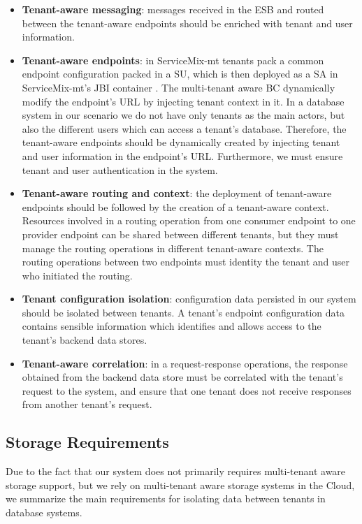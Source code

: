 	\begin{itemize}
		\item \textbf{Tenant-aware messaging}: messages received in the \ac{ESB} and routed between the tenant-aware endpoints should be enriched with tenant and user information. 
		\item \textbf{Tenant-aware endpoints}: in ServiceMix-mt tenants pack a common endpoint configuration packed in a \ac{SU}, which is then deployed as a \ac{SA} in ServiceMix-mt's \ac{JBI} container \cite{gomez2012}. The multi-tenant aware \ac{BC} dynamically modify the endpoint's URL by injecting tenant context in it. In a database system in our scenario we do not have only tenants as the main actors, but also the different users which can access a tenant's database. Therefore, the tenant-aware endpoints should be dynamically created by injecting tenant and user information in the endpoint's URL. Furthermore, we must ensure tenant and user authentication in the system. 
		\item \textbf{Tenant-aware routing and context}: the deployment of tenant-aware endpoints should be followed by the creation of a tenant-aware context. Resources involved in a routing operation from one consumer endpoint to one provider endpoint can be shared between different tenants, but they must manage the routing operations in different tenant-aware contexts. The routing operations between two endpoints must identity the tenant and user who initiated the routing. 
		\item \textbf{Tenant configuration isolation}: configuration data persisted in our system should be isolated between tenants. A tenant's endpoint configuration data contains sensible information which identifies and allows access to the tenant's backend data stores. 
		\item \textbf{Tenant-aware correlation}: in a request-response operations, the response obtained from the backend data store must be correlated with the tenant's request to the system, and ensure that one tenant does not receive responses from another tenant's request.
	\end{itemize}

\subsection{Storage Requirements}

Due to the fact that our system does not primarily requires multi-tenant aware storage support, but we rely on multi-tenant aware storage systems in the Cloud, we summarize the main requirements for isolating data between tenants in database systems. 

